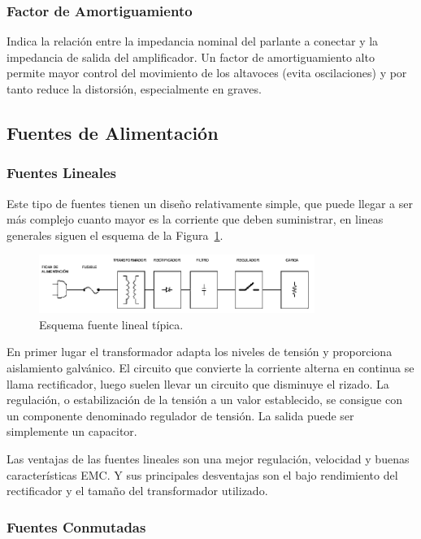 \subsubsection*{Factor de Amortiguamiento}

Indica la relación entre la impedancia nominal del parlante a conectar y la impedancia de salida del amplificador. Un factor de amortiguamiento alto permite mayor control del movimiento de los 
altavoces (evita oscilaciones) y por tanto reduce la distorsión, especialmente en graves. 
\bigskip
\subsection{Fuentes de Alimentación}

\subsubsection{Fuentes Lineales}

Este tipo de fuentes tienen un diseño relativamente simple, que puede llegar a ser más complejo cuanto mayor es la corriente que deben suministrar, en lineas generales siguen el esquema de la Figura~\ref{fuente_lineal_tipo}.

\begin{figure}[H]
\centering
\includegraphics[width=0.8\textwidth]{img/fuente_lineal_tipo.png}
\caption{Esquema fuente lineal típica.}
\label{fuente_lineal_tipo} 
\end{figure}

En primer lugar el transformador adapta los niveles de tensión y proporciona aislamiento galvánico. El circuito que convierte la corriente alterna en continua se llama rectificador, luego suelen llevar un circuito que disminuye el rizado. La regulación, o estabilización de la tensión a un valor establecido, se consigue con un componente denominado regulador de tensión. La salida puede ser simplemente un capacitor. 

Las ventajas de las fuentes lineales son una mejor regulación, velocidad y buenas características EMC. Y sus principales desventajas son el bajo rendimiento del rectificador y el tamaño del transformador utilizado. 

\subsubsection{Fuentes Conmutadas}

